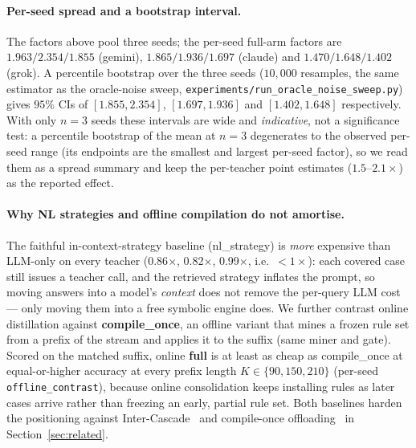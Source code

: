 \documentclass[11pt]{article}
\theoremstyle{plain}
\newcommand{\privNlGemini}{0.86}
\newcommand{\privNlClaude}{0.82}
\newcommand{\privNlGrok}{0.99}
\newcommand{\privFullSZeroGemini}{1.963}
\newcommand{\privFullSOneGemini}{2.354}
\newcommand{\privFullSTwoGemini}{1.855}
\newcommand{\privFullCILoGemini}{1.855}
\newcommand{\privFullCIHiGemini}{2.354}
\newcommand{\privFullSZeroClaude}{1.865}
\newcommand{\privFullSOneClaude}{1.936}
\newcommand{\privFullSTwoClaude}{1.697}
\newcommand{\privFullCILoClaude}{1.697}
\newcommand{\privFullCIHiClaude}{1.936}
\newcommand{\privFullSZeroGrok}{1.470}
\newcommand{\privFullSOneGrok}{1.648}
\newcommand{\privFullSTwoGrok}{1.402}
\newcommand{\privFullCILoGrok}{1.402}
\newcommand{\privFullCIHiGrok}{1.648}
\begin{document}
\paragraph{Per-seed spread and a bootstrap interval.} The factors above pool
three seeds; the per-seed full-arm factors are
$\privFullSZeroGemini/\privFullSOneGemini/\privFullSTwoGemini$ (gemini),
$\privFullSZeroClaude/\privFullSOneClaude/\privFullSTwoClaude$ (claude) and
$\privFullSZeroGrok/\privFullSOneGrok/\privFullSTwoGrok$ (grok). A percentile
bootstrap over the three seeds ($10{,}000$ resamples, the same estimator as the
oracle-noise sweep, \texttt{experiments/run\_oracle\_noise\_sweep.py}) gives
$95\%$ CIs of $[\privFullCILoGemini,\privFullCIHiGemini]$,
$[\privFullCILoClaude,\privFullCIHiClaude]$ and
$[\privFullCILoGrok,\privFullCIHiGrok]$ respectively. With only $n{=}3$ seeds
these intervals are wide and \emph{indicative}, not a significance test: a
percentile bootstrap of the mean at $n{=}3$ degenerates to the observed per-seed
range (its endpoints are the smallest and largest per-seed factor), so we read
them as a spread summary and keep the per-teacher point estimates
($1.5$--$2.1\times$) as the reported effect.

\paragraph{Why NL strategies and offline compilation do not amortise.} The
faithful in-context-strategy baseline (nl\_strategy) is \emph{more} expensive
than LLM-only on every teacher (\privNlGemini$\times$, \privNlClaude$\times$,
\privNlGrok$\times$, i.e.\ ${<}1\times$): each covered case still issues a
teacher call, and the retrieved strategy inflates the prompt, so moving answers
into a model's \emph{context} does not remove the per-query LLM cost --- only
moving them into a free symbolic engine does. We further contrast online
distillation against \textbf{compile\_once}, an offline variant that mines a
frozen rule set from a prefix of the stream and applies it to the suffix
(same miner and gate). Scored on the matched suffix, online \textbf{full} is at
least as cheap as compile\_once at equal-or-higher accuracy at every prefix
length $K\in\{90,150,210\}$ (per-seed \texttt{offline\_contrast}), because
online consolidation keeps installing rules as later cases arrive rather than
freezing an early, partial rule set. Both baselines harden the positioning
against Inter-Cascade~\citep{intercascade2025} and compile-once
offloading~\citep{legaloffload2026,reacomp2026} in
Section~\ref{sec:related}.
\end{document}
